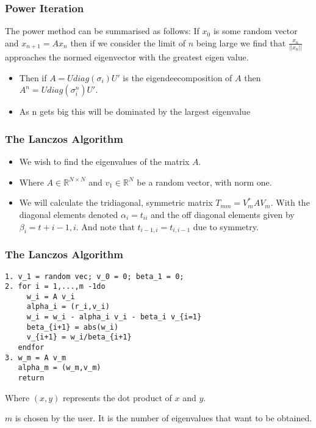\documentclass[pdf]{beamer}
\begin{document}
\begin{frame}
\frametitle{Power Iteration}

The power method can be summarised as follows: If $x_0$ is some random vector and $x_{n+1}=A x_n$ then if we consider the limit of $n$ being large we find that $\frac{x_n}{||x_n||}$ approaches the normed eigenvector with the greatest eigen value. 
\begin{itemize}
\item Then if $A=U {diag} (\sigma_i) U'$ is the eigendeecomposition of $A$ then $A^n = U {diag}(\sigma^n_i) U'$.
\item As n gets big this will be dominated by the largest eigenvalue
\end{itemize}
\end{frame}



\begin{frame}
\frametitle{The Lanczos Algorithm}
\begin{itemize}
\item We wish to find the eigenvalues of the matrix $A$.

\item Where $A \in \mathbb{R}^{N \times N}$ and $v_1 \in \mathbb{R}^N$ be a random vector, with norm one.

\item We will calculate the tridiagonal, symmetric matrix $T_{mm} = V_m^* A V_m$. With the diagonal elements denoted $\alpha_i=t_{ii}$ and the off diagonal elements given by $\beta_i = t+{i-1,i}$. And note that $t_{i-1,i}=t_{i,i-1}$ due to symmetry.
\end{itemize}

\end{frame}


\begin{frame}[fragile]
\frametitle{The Lanczos Algorithm}
\begin{verbatim}
1. v_1 = random vec; v_0 = 0; beta_1 = 0;
2. for i = 1,...,m -1do
     w_i = A v_i
     alpha_i = (r_i,v_i)
     w_i = w_i - alpha_i v_i - beta_i v_{i=1}
     beta_{i+1} = abs(w_i)
     v_{i+1} = w_i/beta_{i+1}
   endfor
3. w_m = A v_m
   alpha_m = (w_m,v_m)
   return
\end{verbatim}

Where $(x,y)$ represents the dot product of $x$ and $y$.

$m$ is chosen by the user. It is the number of eigenvalues that want to be obtained.


\end{frame}
\end{document}
